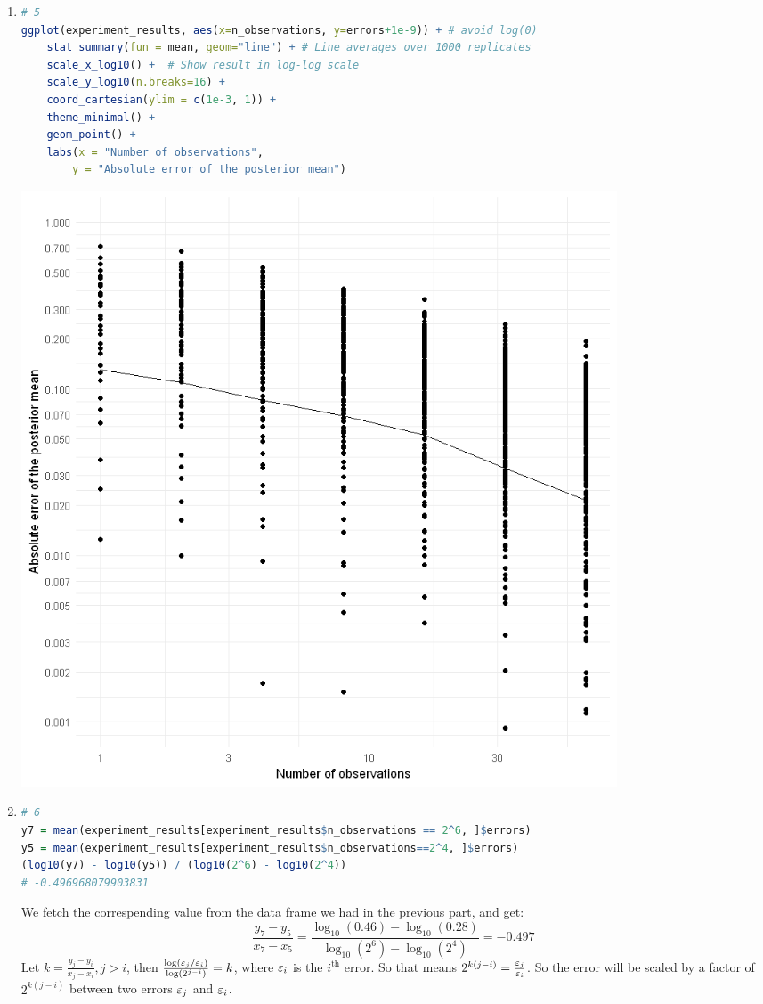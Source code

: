 \documentclass{article}
\begin{document}
\begin{enumerate}
\item 
\begin{lstlisting}[language=R]
# 5
ggplot(experiment_results, aes(x=n_observations, y=errors+1e-9)) + # avoid log(0)
    stat_summary(fun = mean, geom="line") + # Line averages over 1000 replicates
    scale_x_log10() +  # Show result in log-log scale
    scale_y_log10(n.breaks=16) +
    coord_cartesian(ylim = c(1e-3, 1)) +
    theme_minimal() +
    geom_point() +
    labs(x = "Number of observations",
        y = "Absolute error of the posterior mean")
\end{lstlisting}
\includegraphics[width=0.8\textwidth]{errors.png}


\item 
\begin{lstlisting}[language=R]
# 6
y7 = mean(experiment_results[experiment_results$n_observations == 2^6, ]$errors)
y5 = mean(experiment_results[experiment_results$n_observations==2^4, ]$errors)
(log10(y7) - log10(y5)) / (log10(2^6) - log10(2^4))
# -0.496968079903831
\end{lstlisting}
We fetch the correspending value from the data frame we had in the previous part, and get:
\[\frac{y_7 - y_5}{x_7 - x_5} = \frac{\log_{10}(0.46) - \log_{10}(0.28)}{\log_{10}(2^6) - \log_{10}(2^4)} = -0.497\]
Let $k = \frac{y_j - y_i}{x_j - x_i}, j > i$, then $\frac{\log (\varepsilon_j/\varepsilon_i)}{\log (2^{j-i})} = k$, where $\varepsilon_i$ is the $i^\text{th}$ error. So that means $2^{k(j-i)} = \frac{\varepsilon_j}{\varepsilon_i}$. So the error will be scaled by a factor of $2^{k(j-i)}$ between two errors $\varepsilon_j$ and $\varepsilon_i$.




\end{enumerate}
\end{document}
